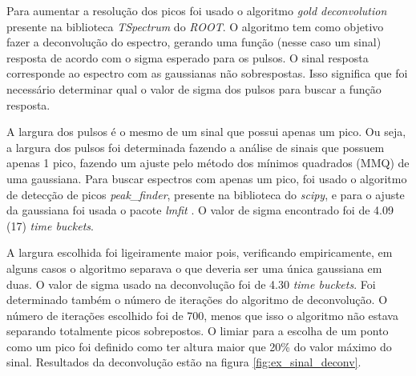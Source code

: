 \documentclass[a4paper,12pt,oneside]{book}
\begin{document}
\par Para aumentar a resolução dos picos foi usado o algoritmo \textit{gold deconvolution} presente na biblioteca \textit{TSpectrum} do \textit{ROOT}\cite{paper_gold_deconv}. O algoritmo tem como objetivo fazer a deconvolução do espectro, gerando uma função (nesse caso um sinal) resposta de acordo com o sigma esperado para os pulsos. O sinal resposta corresponde ao espectro com as gaussianas não sobrespostas. Isso significa que foi necessário determinar qual o valor de sigma dos pulsos para buscar a função resposta.

\par A largura dos pulsos é o mesmo de um sinal que possui apenas um pico. Ou seja, a largura dos pulsos foi determinada fazendo a análise de sinais que possuem apenas 1 pico, fazendo um ajuste pelo método dos mínimos quadrados (MMQ) de uma gaussiana. Para buscar espectros com apenas um pico, foi usado o algoritmo de detecção de picos \textit{peak\_finder}, presente na biblioteca do \textit{scipy}\cite{scipy}, e para o ajuste da gaussiana foi usada o pacote \textit{lmfit} \cite{lmfit}. O valor de sigma encontrado foi de 4.09 (17) \textit{time buckets}.

\par A largura escolhida foi ligeiramente maior pois, verificando empiricamente, em alguns casos o algoritmo separava o que deveria ser uma única gaussiana em duas. O valor de sigma usado na deconvolução foi de 4.30 \textit{time buckets}. Foi determinado também o número de iterações do algoritmo de deconvolução. O número de iterações escolhido foi de 700, menos que isso o algoritmo não estava separando totalmente picos sobrepostos. O limiar para a escolha de um ponto como um pico foi definido como ter altura maior que 20\% do valor máximo do sinal. Resultados da deconvolução estão na figura \ref{fig:ex_sinal_deconv}.
\end{document}
